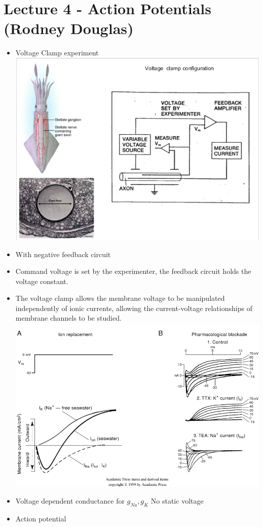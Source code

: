 \documentclass[english,11pt]{article}
\begin{document}
\section{Lecture 4 - Action Potentials (Rodney Douglas)}
\begin{itemize}
\item Voltage Clamp experiment\\
\includegraphics[width=\textwidth]{voltage-clamp-configuration.png}
\item With negative feedback circuit
\item Command voltage is set by the experimenter, the feedback circuit holds the voltage constant.
\item The voltage clamp allows the membrane voltage to be manipulated independently of ionic currents, allowing the current-voltage relationships of membrane channels to be studied.\\
\includegraphics[width=\textwidth]{pharmacological-blockade.png}
\item Voltage dependent conductance for $g_{Na}, g_{K}$
\subitem No static voltage
\item Action potential\\
\end{itemize}
\end{document}
